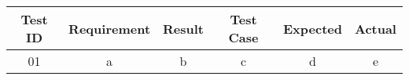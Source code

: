 \documentclass{article}
\begin{document}
    

    \begin{center}
    \begin{tabular}{|c|c|c|c|c|c|}
      \hline
      \textbf{Test ID} & \textbf{Requirement} & \textbf{Result} & \textbf{Test Case} & \textbf{Expected} & \textbf{Actual} \\ [.5ex]
      \hline
      01 & a & b & c & d & e \\
      \hline

      \hline
    \end{tabular}
    \end{center}
\end{document}
